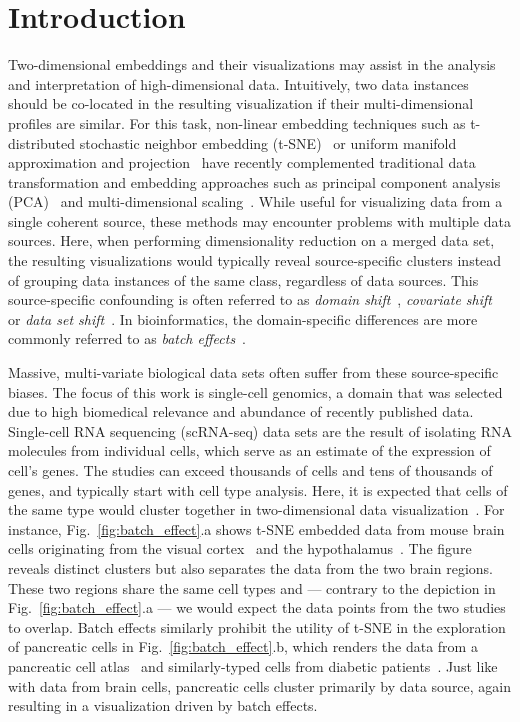\documentclass[runningheads]{llncs}
\begin{document}
\section{Introduction}
\label{sec:intro}

Two-dimensional embeddings and their visualizations may assist in the analysis
and interpretation of high-dimensional data. Intuitively, two data instances
should be co-located in the resulting visualization if their multi-dimensional
profiles are similar. For this task, non-linear embedding techniques such as
t\nobreakdash -distributed stochastic neighbor embedding (t-SNE)~\cite{Maaten2008} or
uniform manifold approximation and projection~\cite{McInnes2018} have recently
complemented traditional data transformation and embedding approaches such as
principal component analysis (PCA)~\cite{wold1987principal} and multi-dimensional
scaling~\cite{cox2008multidimensional}. While useful for visualizing data from
a single coherent source, these methods may encounter problems with multiple
data sources. Here, when performing dimensionality reduction on a merged data
set, the resulting visualizations would typically reveal source-specific
clusters instead of grouping data instances of the same class, regardless of
data sources. This source-specific confounding is often referred to as {\em
domain shift}~\cite{domain_shift}, {\em covariate shift}~\cite{covariate_shift}
or {\em data set shift}~\cite{dataset_shift}. In bioinformatics, the
domain-specific differences are more commonly referred to as {\em batch
effects}~\cite{Butler2018,Haghverdi2018,Stuart2019}.

Massive, multi-variate biological data sets often suffer from these
source-specific biases.  The focus of this work is single-cell genomics, a
domain that was selected due to high biomedical relevance and abundance of
recently published data. Single-cell RNA sequencing (scRNA-seq) data sets are
the result of isolating RNA molecules from individual cells, which serve as an
estimate of the expression of cell's genes.  The studies can exceed thousands
of cells and tens of thousands of genes, and typically start with cell type
analysis. Here, it is expected that cells of the same type would cluster
together in two-dimensional data visualization~\cite{Wolf2018}. For instance,
Fig.~\ref{fig:batch_effect}.a shows t-SNE embedded data from mouse brain cells
originating from the visual cortex~\cite{Hrvatin2018} and the
hypothalamus~\cite{Chen2017}. The figure reveals distinct clusters but also
separates the data from the two brain regions. These two regions share the same
cell types and --- contrary to the depiction in Fig.~\ref{fig:batch_effect}.a
--- we would expect the data points from the two studies to overlap. Batch
effects similarly prohibit the utility of t-SNE in the exploration of
pancreatic cells in Fig.~\ref{fig:batch_effect}.b, which renders the data from
a pancreatic cell atlas~\cite{Baron2016} and similarly-typed cells from
diabetic patients~\cite{Xin2016}. Just like with data from brain cells,
pancreatic cells cluster primarily by data source, again resulting in a
visualization driven by batch effects.
\end{document}
